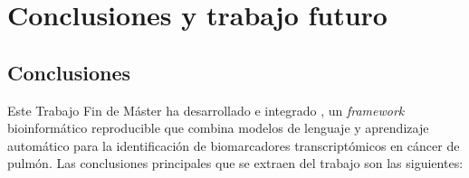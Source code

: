 \chapter{Conclusiones y trabajo futuro}
\label{cap:conclusiones}

\section{Conclusiones}
\label{sec:conc_principales}

Este Trabajo Fin de Máster ha desarrollado e integrado \framework, un
\emph{framework} bioinformático reproducible que combina modelos de
lenguaje y aprendizaje automático para la identificación de biomarcadores
transcriptómicos en cáncer de pulmón. Las conclusiones principales que se
extraen del trabajo son las siguientes:

